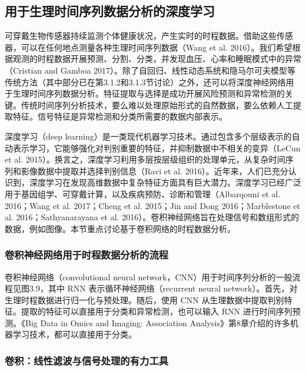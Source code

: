 \subsection{用于生理时间序列数据分析的深度学习}

可穿戴生物传感器持续监测个体健康状况，产生实时的时程数据。借助这些传感器，可以在任何地点测量各种生理时间序列数据（Wang et al. 2016）。我们希望根据观测的时程数据开展预测、分割、分类，并发现血压、心率和睡眠模式中的异常（Cristian and Gamboa 2017）。除了自回归、线性动态系统和隐马尔可夫模型等传统方法（其中部分已在第3.1.2和3.1.3节讨论）之外，还可以将深度神经网络用于生理时间序列数据分析。特征提取与选择是成功开展风险预测和异常检测的关键。传统时间序列分析技术，要么难以处理原始形式的自然数据，要么依赖人工提取特征。信号特征是异常检测和分类所需要的数据内部表示。

深度学习（deep learning）是一类现代机器学习技术。通过包含多个层级表示的自动表示学习，它能够强化对判别重要的特征，并抑制数据中不相关的变异（LeCun et al. 2015）。换言之，深度学习利用多层按层级组织的处理单元，从复杂时间序列和影像数据中提取并选择判别信息（Ravi et al. 2016）。近年来，人们已充分认识到，深度学习在发现高维数据中复杂特征方面具有巨大潜力。深度学习已经广泛用于基因组学、可穿戴计算，以及疾病预防、诊断和管理（Albarqouni et al. 2016；Wang et al. 2017；Cheng et al. 2015；Jin and Dong 2016；Marblestone et al. 2016；Sathyanarayana et al. 2016）。卷积神经网络旨在处理信号和数组形式的数据，例如图像。本节重点讨论基于卷积网络的时程数据分析。

\subsubsection{卷积神经网络用于时程数据分析的流程}

卷积神经网络（convolutional neural network，CNN）用于时间序列分析的一般流程见图3.9，其中 RNN 表示循环神经网络（recurrent neural network）。首先，对生理时程数据进行归一化与预处理。随后，使用 CNN 从生理数据中提取判别特征。提取的特征可以直接用于分类和异常检测，也可以输入 RNN 进行时间序列预测。《Big Data in Omics and Imaging: Association Analysis》第8章介绍的许多机器学习技术，都可以直接用于分类。


\FloatBarrier

\subsubsection{卷积：线性滤波与信号处理的有力工具}

